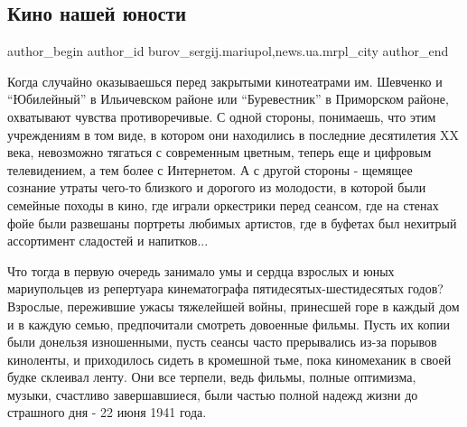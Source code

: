  
 
 
 
 
 
\subsection{Кино нашей юности}
\label{sec:10_11_2018.stz.news.ua.mrpl_city.1.kino_nashej_junosti}
 
\ifcmt
 author_begin
   author_id burov_sergij.mariupol,news.ua.mrpl_city
 author_end
\fi


Когда случайно оказываешься перед закрытыми кинотеатрами им. Шевченко и
\enquote{Юбилейный} в Ильичевском районе или \enquote{Буревестник} в Приморском районе,
охватывают чувства противоречивые. С одной стороны, понимаешь, что этим
учреждениям в том виде, в котором они находились в последние десятилетия XX
века, невозможно тягаться с современным цветным, теперь еще и цифровым
телевидением, а тем более с Интернетом. А с другой стороны - щемящее сознание
утраты чего-то близкого и дорогого из молодости, в которой были семейные походы
в кино, где играли оркестрики перед сеансом, где на стенах фойе были развешаны
портреты любимых артистов, где в буфетах был нехитрый ассортимент сладостей и
напитков...


Что тогда в первую очередь занимало умы и сердца взрослых и юных мариупольцев
из репертуара кинематографа пятидесятых-шестидесятых годов? Взрослые,
пережившие ужасы тяжелейшей войны, принесшей горе в каждый дом и в каждую
семью, предпочитали смотреть довоенные фильмы. Пусть их копии были донельзя
изношенными, пусть сеансы часто прерывались из-за порывов киноленты, и
приходилось сидеть в кромешной тьме, пока киномеханик в своей будке склеивал
ленту. Они все терпели, ведь фильмы, полные оптимизма, музыки, счастливо
завершавшиеся, были частью полной надежд жизни до страшного дня - 22 июня 1941
года.

